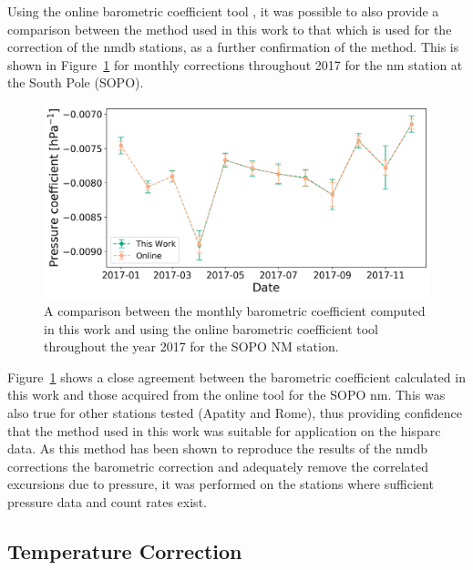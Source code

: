 Using the online barometric coefficient tool \citep{paschalis_online_2013}, it was possible to also provide a comparison between the method used in this work to that which is used for the correction of the \gls{nmdb} stations, as a further confirmation of the method. This is shown in Figure~\ref{fig:NM_beta_variation} for monthly corrections throughout 2017 for the \gls{nm} station at the South Pole (SOPO).

\begin{figure}[ht]
	\centering
	\includegraphics[width=0.65\columnwidth]{SOPO_beta_2017_rescale.png}
	\caption{A comparison between the monthly barometric coefficient computed in this work and using the online barometric coefficient tool throughout the year 2017 for the SOPO NM station.}
	\label{fig:NM_beta_variation}
\end{figure}


Figure~\ref{fig:NM_beta_variation} shows a close agreement between the barometric coefficient calculated in this work and those acquired from the online tool for the SOPO \gls{nm}. This was also true for other stations tested (Apatity and Rome), thus providing confidence that the method used in this work was suitable for application on the \gls{hisparc} data. As this method has been shown to reproduce the results of the \gls{nmdb} corrections the barometric correction and adequately remove the correlated excursions due to pressure, it was performed on the stations where sufficient pressure data and count rates exist. %





\subsection{Temperature Correction}\label{sec:HS_T_corr}

